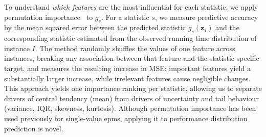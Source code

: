 To understand \emph{which features} are the most influential for each statistic, we apply permutation importance~\citep{Breiman2001} to $g_s$. 
For a statistic $s$, we measure predictive accuracy by the mean squared error between the predicted statistic $g_s(\mathbf{z}_I)$ and the corresponding statistic estimated from the observed running time distribution of instance $I$.
The method randomly shuffles the values of one feature across instances, breaking any association between that feature and the statistic-specific target, and measures the resulting increase in MSE: important features yield a substantially larger increase, while irrelevant features cause negligible changes.
This approach yields one importance ranking per statistic, allowing us to separate drivers of central tendency (mean) from drivers of uncertainty and tail behaviour (variance, IQR, skewness, kurtosis).
Although permutation importance has been used previously for single-value \glspl{epm}, applying it to performance distribution prediction is novel. 

